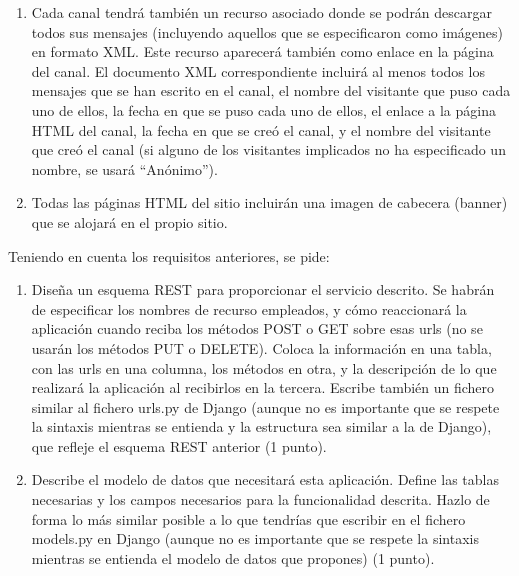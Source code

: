 {\begin{enumerate}
Las urls de imágenes se considerarán también como mensajes, pero antes de mostrarlos como tales (y de almacenarlos en la base de datos), se convertirán a un elemento IMG de HTML. Por ejemplo, la imagen de url \verb|http://fotos.com/123345.jpg| se convertirá en el HTML siguiente (que se considerará el ``mensaje'' en el formato descrito anteriormente):

\begin{verbatim}
<img src="http://fotos.com/123345.jpg" style="width:200px;height:150px;">
\end{verbatim}

Tras poner un nuevo mensaje (o una imagen) en un canal, el visitante vuelve a ver de nuevo la página del canal.

\item Cada canal tendrá también un recurso asociado donde se podrán descargar todos sus mensajes (incluyendo aquellos que se especificaron como imágenes) en formato XML. Este recurso aparecerá también como enlace en la página del canal. El documento XML correspondiente incluirá al menos todos los mensajes que se han escrito en el canal, el nombre del visitante que puso cada uno de ellos, la fecha en que se puso cada uno de ellos, el enlace a la página HTML del canal, la fecha en que se creó el canal, y el nombre del visitante que creó el canal (si alguno de los visitantes implicados no ha especificado un nombre, se usará ``Anónimo'').
\item Todas las páginas HTML del sitio incluirán una imagen de cabecera (banner) que se alojará en el propio sitio.
\end{enumerate}

Teniendo en cuenta los requisitos anteriores, se pide:

\begin{enumerate}
\item Diseña un esquema REST para proporcionar el servicio descrito. Se habrán de especificar los nombres de recurso empleados, y cómo reaccionará la aplicación cuando reciba los métodos POST o GET sobre esas urls (no se usarán los métodos PUT o DELETE). Coloca la información en una tabla, con las urls en una columna, los métodos en otra, y la descripción de lo que realizará la aplicación al recibirlos en la tercera. Escribe también un fichero similar al fichero urls.py de Django (aunque no es importante que se respete la sintaxis mientras se entienda y la estructura sea similar a la de Django), que refleje el esquema REST anterior (1 punto).

\item Describe el modelo de datos que necesitará esta aplicación. Define las tablas necesarias y los campos necesarios para la funcionalidad descrita. Hazlo de forma lo más similar posible a lo que tendrías que escribir en el fichero models.py en Django (aunque no es importante que se respete la sintaxis mientras se entienda el modelo de datos que propones) (1 punto).


\end{enumerate}}

